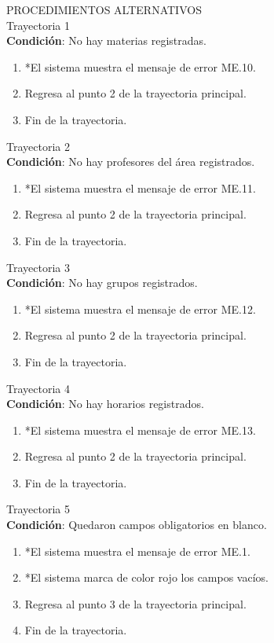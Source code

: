 \vspace*{1cm}
\Large{PROCEDIMIENTOS ALTERNATIVOS}\\
\large{Trayectoria 1}\\
\textbf{Condición}: No hay materias registradas.
\begin{enumerate}
\item *El sistema muestra el mensaje de error ME.10.
\item Regresa al punto 2 de la trayectoria principal.
\item Fin de la trayectoria.
\end{enumerate}
\large{Trayectoria 2}\\
\textbf{Condición}: No hay profesores del área registrados.
\begin{enumerate}
\item *El sistema muestra el mensaje de error ME.11.
\item Regresa al punto 2 de la trayectoria principal.
\item Fin de la trayectoria.
\end{enumerate}
\large{Trayectoria 3}\\
\textbf{Condición}: No hay grupos registrados.
\begin{enumerate}
\item *El sistema muestra el mensaje de error ME.12.
\item Regresa al punto 2 de la trayectoria principal.
\item Fin de la trayectoria.
\end{enumerate}
\newpage
\noindent
\large{Trayectoria 4}\\
\textbf{Condición}: No hay horarios registrados.
\begin{enumerate}
\item *El sistema muestra el mensaje de error ME.13.
\item Regresa al punto 2 de la trayectoria principal.
\item Fin de la trayectoria.
\end{enumerate}
\large{Trayectoria 5}\\
\textbf{Condición}: Quedaron campos obligatorios en blanco.
\begin{enumerate}
\item *El sistema muestra el mensaje de error ME.1.
\item *El sistema marca de color rojo los campos vacíos.
\item Regresa al punto 3 de la trayectoria principal.
\item Fin de la trayectoria.
\end{enumerate}
